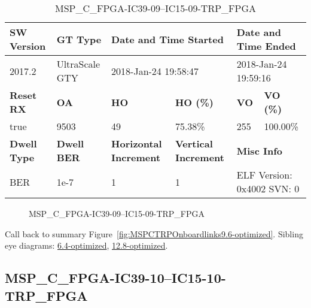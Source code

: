\begin{table}[h]
\centering
\caption{MSP\_C\_FPGA-IC39-09--IC15-09-TRP\_FPGA}
\label{tab:MSPCFPGAIC3909IC1509TRPFPGA9.6-optimized}
\begin{tabular}{@{}|l|l|l|l|l|l|@{}}
\toprule
\textbf{SW Version}                & \textbf{GT Type}   & \multicolumn{2}{l|}{\textbf{Date and Time Started}}            & \multicolumn{2}{l|}{\textbf{Date and Time Ended}}        \\ \midrule
2017.2                       & UltraScale GTY          & \multicolumn{2}{l|}{2018-Jan-24 19:58:47}                   & \multicolumn{2}{l|}{2018-Jan-24 19:59:16}               \\ \midrule
\textbf{Reset RX}                  & \textbf{OA} & \textbf{HO}   & \textbf{HO (\%)} & \textbf{VO} & \textbf{VO (\%)} \\ \midrule
true & 9503        & 49          & 75.38\%        & 255        & 100.00\%       \\ \midrule
\textbf{Dwell Type}                & \textbf{Dwell BER} & \textbf{Horizontal Increment} & \textbf{Vertical Increment}    & \multicolumn{2}{l|}{\textbf{Misc Info}}                  \\ \midrule
BER                            & 1e-7        & 1        & 1           & \multicolumn{2}{l|}{ELF Version: 0x4002 SVN: 0}                         \\ \bottomrule
\end{tabular}
\end{table}

\begin{figure}[h]
\caption{MSP\_C\_FPGA-IC39-09--IC15-09-TRP\_FPGA} \label{fig:MSPCFPGAIC3909IC1509TRPFPGA9.6-optimized}
\end{figure}

Call back to summary Figure~\ref{fig:MSPCTRPOnboardlinks9.6-optimized}.
Sibling eye diagrams: \hyperref[sec:MSPCFPGAIC3909IC1509TRPFPGA6.4-optimized]{6.4-optimized}, \hyperref[sec:MSPCFPGAIC3909IC1509TRPFPGA12.8-optimized]{12.8-optimized}.

\clearpage
\newpage


\subsection{MSP\_C\_FPGA-IC39-10--IC15-10-TRP\_FPGA}\label{sec:MSPCFPGAIC3910IC1510TRPFPGA9.6-optimized}

